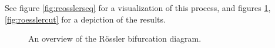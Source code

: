 See figure \ref{fig:reosslerseq} for a visualization of this process, and figures \ref{fig:roesslerfull}, \ref{fig:roesslercut} for a depiction of the results.

%
%


\begin{figure}
\centering{}
\caption{An overview of the Rössler bifurcation diagram.}
\label{fig:roesslerfull}
\end{figure}

